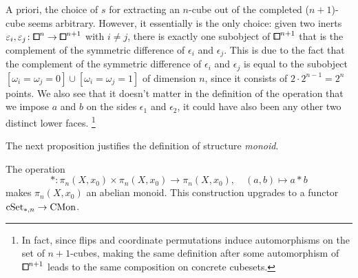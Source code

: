 \begin{remark}
A priori, the choice of $s$ for extracting an $n$-cube out of the completed ($n+1$)-cube
seems arbitrary.
However, it essentially is the only choice:
given two inerts $\epsilon_i,\epsilon_j\colon{\bbox}^n\to{\bbox}^{n+1}$ with $i\neq j$,
there is exactly one subobject of ${\bbox}^{n+1}$ that is the complement of the symmetric difference of $\epsilon_i$ and $\epsilon_j$.
This is due to the fact that the complement of the symmetric difference of $\epsilon_i$ and $\epsilon_j$
is equal to the subobject $[\omega_i=\omega_j=0]\cup[\omega_i=\omega_j=1]$ of dimension $n$,
since it consists of $2\cdot 2^{n-1} = 2^n$ points.
We also see that it doesn't matter in the definition of the operation that we impose $a$ and $b$
on the sides $\epsilon_1$ and $\epsilon_2$, it could have also been any other two distinct lower faces.%
\footnote{In fact, since flips and coordinate permutations induce automorphisms on the set of $n+1$-cubes, making the same definition after some automorphism of $\bbox^{n+1}$ leads to the same composition on concrete cubesets.}
\end{remark}

The next proposition justifies the definition of structure \emph{monoid}.

\begin{proposition}\label{prop:structure-group-is-monoid}
The operation
\[
    *\colon\pi_n(X,x_0)\times\pi_n(X,x_0)\to\pi_n(X,x_0),\quad (a,b)\mapsto a*b
\]
makes $\pi_n(X,x_0)$ an abelian monoid.
This construction upgrades to a functor $\mathrm{cSet}_{\ast,n}\to\mathrm{CMon}$.
\end{proposition}

